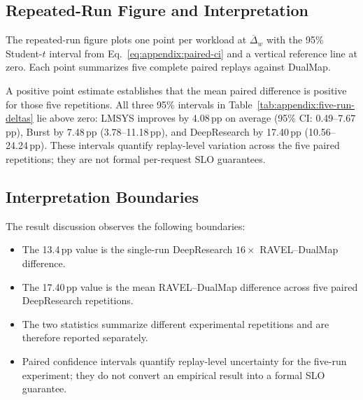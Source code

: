 \documentclass[letterpaper,twocolumn,10pt]{article}
\begin{document}
\subsection{Repeated-Run Figure and Interpretation}
\label{sec:appendix:repeated-run-figure}

The repeated-run figure plots one point per workload at
$\overline{\Delta}_w$ with the 95\% Student-$t$ interval from
Eq.~\ref{eq:appendix:paired-ci} and a vertical reference line at zero.
Each point summarizes five complete paired replays against DualMap.

A positive point estimate establishes that the mean paired difference is
positive for those five repetitions.  All three 95\% intervals in
Table~\ref{tab:appendix:five-run-deltas} lie above zero: LMSYS improves by
4.08\,pp on average (95\% CI: 0.49--7.67\,pp), Burst by 7.48\,pp
(3.78--11.18\,pp), and DeepResearch by 17.40\,pp
(10.56--24.24\,pp).  These intervals quantify replay-level variation across
the five paired repetitions; they are not formal per-request SLO guarantees.



\subsection{Interpretation Boundaries}
\label{sec:appendix:result-boundaries}

The result discussion observes the following boundaries:

\begin{itemize}
    \item The 13.4\,pp value is the single-run DeepResearch $16\times$
          RAVEL--DualMap difference.
    \item The 17.40\,pp value is the mean RAVEL--DualMap difference
          across five paired DeepResearch repetitions.
    \item The two statistics summarize different experimental repetitions and
          are therefore reported separately.
    \item Paired confidence intervals quantify replay-level uncertainty for
          the five-run experiment; they do not convert an empirical result
          into a formal SLO guarantee.
\end{itemize}
\end{document}
